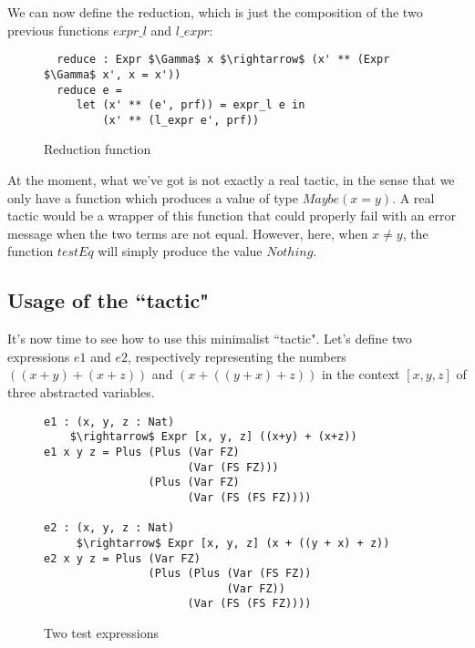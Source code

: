 We can now define the reduction, which is just the composition of the two previous functions $expr\_l$ and $l\_expr$:

\begin{figure}[H]
\figrule
\begin{center}
\begin{lstlisting}
  reduce : Expr $\Gamma$ x $\rightarrow$ (x' ** (Expr $\Gamma$ x', x = x'))
  reduce e = 
     let (x' ** (e', prf)) = expr_l e in
         (x' ** (l_expr e', prf))
\end{lstlisting}
\end{center}
\caption{Reduction function}
\label{reduce}
\figrule
\end{figure}


At the moment, what we've got is not exactly a real tactic, in the sense that we only have a function which produces a value of type $Maybe (x = y)$. A real tactic would be a wrapper of this function that could properly fail with an error message when the two terms are not equal. However, here, when $x\ne y$, the function $testEq$ will simply produce the value $Nothing$. \\

\subsection{Usage of the ``tactic"}

It's now time to see how to use this minimalist ``tactic".
Let's define two expressions $e1$ and $e2$, respectively representing the numbers $((x + y) + (x + z))$ and $(x + ((y + x) + z))$ in the context $[x, y, z]$ of three abstracted variables.


\begin{figure}[H]
\figrule
\begin{center}
\begin{lstlisting}
e1 : (x, y, z : Nat) 
    $\rightarrow$ Expr [x, y, z] ((x+y) + (x+z))
e1 x y z = Plus (Plus (Var FZ) 
                      (Var (FS FZ))) 
                (Plus (Var FZ) 
                      (Var (FS (FS FZ))))

e2 : (x, y, z : Nat) 
     $\rightarrow$ Expr [x, y, z] (x + ((y + x) + z))
e2 x y z = Plus (Var FZ) 
                (Plus (Plus (Var (FS FZ)) 
                            (Var FZ)) 
                      (Var (FS (FS FZ))))
\end{lstlisting}
\end{center}
\caption{Two test expressions}
\label{e1_e2}
\figrule
\end{figure}

